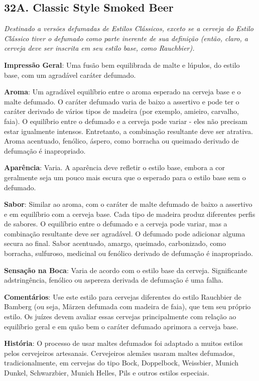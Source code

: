 \subsection*{32A. Classic Style Smoked Beer}
\textit{Destinado a versões defumadas de Estilos Clássicos, exceto se a cerveja do Estilo Clássico tiver o defumado como parte inerente de sua definição (então, claro, a cerveja deve ser inscrita em seu estilo base, como Rauchbier).}

\textbf{Impressão Geral}: Uma fusão bem equilibrada de malte e lúpulos, do estilo base, com um agradável caráter defumado.

\textbf{Aroma}: Um agradável equilíbrio entre o aroma esperado na cerveja base e o malte defumado. O caráter defumado varia de baixo a assertivo e pode ter o caráter derivado de vários tipos de madeira (por exemplo, amieiro, carvalho, faia). O equilíbrio entre o defumado e a cerveja pode variar - eles não precisam estar igualmente intensos. Entretanto, a combinação resultante deve ser atrativa. Aroma acentuado, fenólico, áspero, como borracha ou queimado derivado de defumação é inapropriado.

\textbf{Aparência}: Varia. A aparência deve refletir o estilo base, embora a cor geralmente seja um pouco mais escura que o esperado para o estilo base sem o defumado.

\textbf{Sabor}: Similar ao aroma, com o caráter de malte defumado de baixo a assertivo e em equilíbrio com a cerveja base. Cada tipo de madeira produz diferentes perfis de sabores. O equilíbrio entre o defumado e a cerveja pode variar, mas a combinação resultante deve ser agradável. O defumado pode adicionar alguma secura ao final. Sabor acentuado, amargo, queimado, carbonizado, como borracha, sulfuroso, medicinal ou fenólico derivado de defumação é inapropriado.

\textbf{Sensação na Boca}: Varia de acordo com o estilo base da cerveja. Significante adstringência, fenólico ou aspereza derivada de defumação é uma falha.

\textbf{Comentários}: Use este estilo para cervejas diferentes do estilo Rauchbier de Bamberg (ou seja, Märzen defumada com madeira de faia), que tem seu próprio estilo. Os juízes devem avaliar essas cervejas principalmente com relação ao equilíbrio geral e em quão bem o caráter defumado aprimora a cerveja base.

\textbf{História}: O processo de usar maltes defumados foi adaptado a muitos estilos pelos cervejeiros artesanais. Cervejeiros alemães usaram maltes defumados, tradicionalmente, em cervejas do tipo Bock, Doppelbock, Weissbier, Munich Dunkel, Schwarzbier, Munich Helles, Pils e outros estilos especiais.

